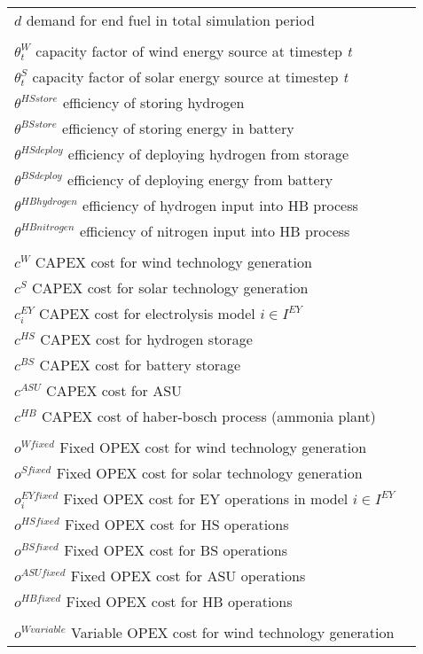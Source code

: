 \documentclass[12 pt]{article}
\begin{document}
\begin{tabular}{ll}

$d$  demand for end fuel in total simulation period \\
\\
$\theta^{W}_{t}$ capacity factor of wind energy source at timestep \textit{t} \\
$\theta^{S}_{t}$ capacity factor of solar energy source at timestep \textit{t} \\
$\theta^{HS store}$ efficiency of storing hydrogen \\
$\theta^{BS store}$ efficiency of storing energy in battery \\
$\theta^{HS deploy}$ efficiency of deploying hydrogen from storage\\
$\theta^{BS deploy}$ efficiency of deploying energy from battery \\
$\theta^{HBhydrogen}$ efficiency of hydrogen input into HB process\\
$\theta^{HBnitrogen}$ efficiency of nitrogen input into HB process\\
\\
$c^{W}$ CAPEX cost for wind technology generation \\
$c^{S}$ CAPEX cost for solar technology generation \\
$c^{EY}_{i}$ CAPEX cost for electrolysis model $i \in I^{EY}$\\
$c^{HS}$ CAPEX cost for hydrogen storage\\
$c^{BS}$ CAPEX cost for battery storage\\
$c^{ASU}$ CAPEX cost for ASU\\
$c^{HB}$ CAPEX cost of haber-bosch process (ammonia plant)\\
\\
$o^{W fixed}$ Fixed OPEX cost for wind technology generation \\
$o^{S fixed}$ Fixed OPEX cost for solar  technology generation \\
$o^{EY fixed}_{i}$ Fixed OPEX cost for EY operations in model $i \in I^{EY}$\\
$o^{HS fixed}$ Fixed OPEX cost for HS operations \\
$o^{BS fixed}$ Fixed OPEX cost for BS operations \\
$o^{ASU fixed}$ Fixed OPEX cost for ASU operations \\
$o^{HB fixed}$ Fixed OPEX cost for HB operations \\
\\
$o^{W variable}$ Variable OPEX cost for wind technology generation \\

\end{tabular}
\end{document}
